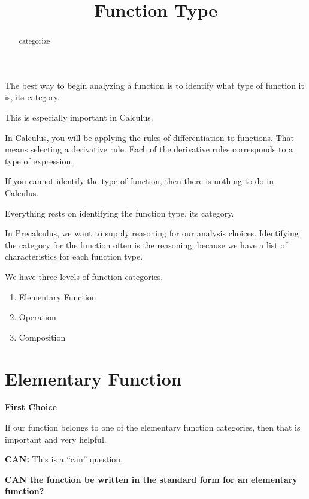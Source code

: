 \documentclass{ximera}
\title{Function Type}
\begin{document}
\begin{abstract}
categorize
\end{abstract}
\maketitle








The best way to begin analyzing a function is to identify what type of function it is, its category.

This is especially important in Calculus.   


In Calculus, you will be applying the rules of differentiation to functions. That means selecting a derivative rule.  Each of the derivative rules corresponds to a type of expression. 

If you cannot identify the type of function, then there is nothing to do in Calculus. 

Everything rests on identifying the function type, its category. 



In Precalculus, we want to supply reasoning for our analysis choices.  Identifying the category for the function often is the reasoning, because we have a list of characteristics for each function type. 



We have three levels of function categories.

\begin{enumerate}
    \item Elementary Function
    \item Operation
    \item Composition
\end{enumerate} 



\section*{Elementary Function}

\textbf{\textcolor{purple!85!blue}{First Choice}} 


If our function belongs to one of the elementary function categories, then that is important and very helpful. 


\textbf{\textcolor{purple!85!blue}{CAN:}}   This is a ``can'' question. 

\begin{center}
\textbf{\textcolor{red!70!black}{CAN the function be written in the standard form for an elementary function?}}

\end{center}
\end{document}

